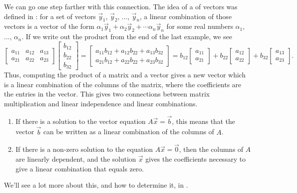 \documentclass{ximera}
\begin{document}
We can go one step farther with this connection. The idea of a  of vectors was defined in : for a set of vectors $\vec{y}_1$, $\vec{y}_2$, ..., $\vec{y}_n$, a linear combination of those vectors is a vector of the form $\alpha_1\vec{y}_1 + \alpha_2\vec{y}_2 + \cdots \alpha_n \vec{y}_n$ for some real numbers $\alpha_1$, ..., $\alpha_n$. If we write out the product from the end of the last example, we see
\begin{equation*}
    \begin{bmatrix}
        a_{11} & a_{12} & a_{13} \\
        a_{21} & a_{22} & a_{23}
    \end{bmatrix}
    \begin{bmatrix}
        b_{12} \\
        b_{22} \\
        b_{32}
    \end{bmatrix} 
    = 
    \begin{bmatrix} 
        a_{11}b_{12} + a_{12}b_{22} + a_{13}b_{32} \\ 
        a_{21}b_{12} + a_{22}b_{22} + a_{23}b_{32} 
    \end{bmatrix} 
    = b_{12} 
    \begin{bmatrix} 
        a_{11} \\ 
        a_{21} 
    \end{bmatrix} 
    + b_{22} 
    \begin{bmatrix} 
        a_{12} \\ 
        a_{22} 
    \end{bmatrix} 
    + b_{32} 
    \begin{bmatrix} 
        a_{13} \\ 
        a_{23} 
    \end{bmatrix}.
\end{equation*}
Thus, computing the product of a matrix and a vector gives a new vector which is a linear combination of the columns of the matrix, where the coefficients are the entries in the vector. This gives two connections between matrix multiplication and linear independence and linear combinations.
\begin{enumerate}
    \item If there is a solution to the vector equation $A\vec{x} = \vec{b}$, this means that the vector $\vec{b}$ can be written as a linear combination of the columns of $A$.
    \item If there is a non-zero solution to the equation $A\vec{x} = \vec{0}$, then the columns of $A$ are linearly dependent, and the solution $\vec{x}$ gives the coefficients necessary to give a linear combination that equals zero.
\end{enumerate}
We'll see a lot more about this, and how to determine it, in .
\end{document}

